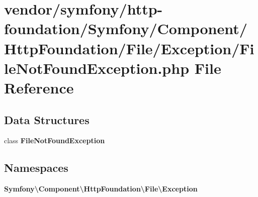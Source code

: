 \section{vendor/symfony/http-\/foundation/\+Symfony/\+Component/\+Http\+Foundation/\+File/\+Exception/\+File\+Not\+Found\+Exception.php File Reference}
\label{symfony_2http-foundation_2_symfony_2_component_2_http_foundation_2_file_2_exception_2_file_not_found_exception_8php}
\subsection*{Data Structures}
\begin{DoxyCompactItemize}
\item 
class {\bf File\+Not\+Found\+Exception}
\end{DoxyCompactItemize}
\subsection*{Namespaces}
\begin{DoxyCompactItemize}
\item 
 {\bf Symfony\textbackslash{}\+Component\textbackslash{}\+Http\+Foundation\textbackslash{}\+File\textbackslash{}\+Exception}
\end{DoxyCompactItemize}
